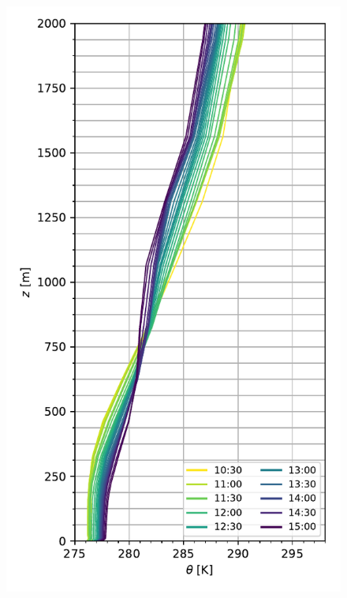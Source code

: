 \vspace*{\fill}
\begin{figure}[H]
	\begin{minipage}{0.5\linewidth}
	\end{minipage}%
	\begin{minipage}{0.5\linewidth}
	\end{minipage}%
	
	\begin{minipage}{0.5\linewidth}
		\centering
		\includegraphics[width=0.9\linewidth,trim={0cm 5mm 0cm 0mm},clip]{Imagenes/06/bol/mean_pbl}%

\end{minipage}
\end{figure}
